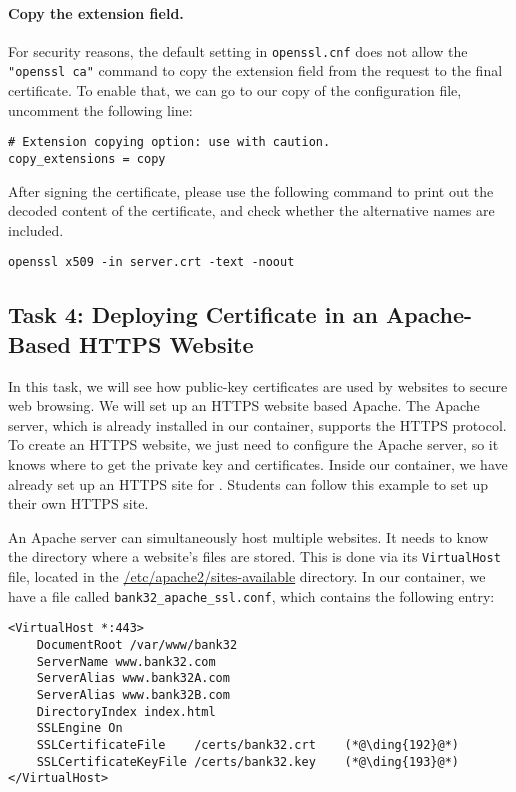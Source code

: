 \paragraph{Copy the extension field.}
For security reasons, the default setting in \texttt{openssl.cnf} does not allow
the \texttt{"openssl ca"} command to copy the extension field 
from the request to the final certificate. To enable that, we 
can go to our copy of the configuration file,
uncomment the following line: 

\begin{lstlisting}
# Extension copying option: use with caution.
copy_extensions = copy
\end{lstlisting}
 

After signing the certificate, please use the following command to print out 
the decoded content of the certificate, and check whether the 
alternative names are included.

\begin{lstlisting}
openssl x509 -in server.crt -text -noout 
\end{lstlisting}


\subsection{Task 4: Deploying Certificate in an Apache-Based HTTPS Website}

In this task, we will see how public-key certificates 
are used by websites to secure web browsing. We will set up
an HTTPS website based Apache.  The Apache server, which is already 
installed in our container, supports the HTTPS protocol. 
To create an HTTPS website, we just need to 
configure the Apache server, so it knows where to get the private key and certificates. 
Inside our container, we have already set up an HTTPS site for \pkiserver. 
Students can follow this example to set up their own HTTPS site.

An Apache server can simultaneously host multiple websites. It needs to know
the directory where a website's files are stored. This is done via its 
\texttt{VirtualHost} file, located in the \url{/etc/apache2/sites-available}
directory. In our container, we have a file called
\texttt{bank32\_apache\_ssl.conf}, which contains the following entry:

\begin{lstlisting}
<VirtualHost *:443>
    DocumentRoot /var/www/bank32
    ServerName www.bank32.com
    ServerAlias www.bank32A.com
    ServerAlias www.bank32B.com
    DirectoryIndex index.html
    SSLEngine On
    SSLCertificateFile    /certs/bank32.crt    (*@\ding{192}@*)
    SSLCertificateKeyFile /certs/bank32.key    (*@\ding{193}@*)
</VirtualHost>
\end{lstlisting}

